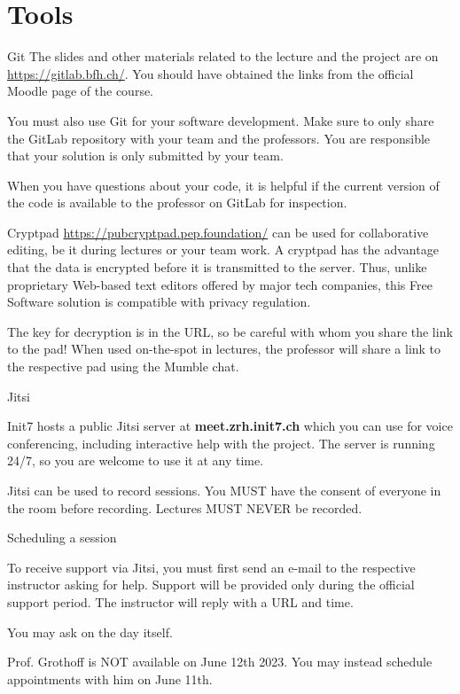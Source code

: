 \documentclass{beamer}
\begin{document}
\section{Tools}

\begin{frame}{Git}
The slides and other materials related to the lecture and the project
are on \url{https://gitlab.bfh.ch/}. You should have obtained the links from
the official Moodle page of the course.

You must also use Git for your software development. Make sure to only
share the GitLab repository with your team and the professors. You are
responsible that your solution is only submitted by your team.

When you have questions about your code, it is helpful if the current
version of the code is available to the professor on GitLab for
inspection.
\end{frame}


\begin{frame}{Cryptpad}
\url{https://pubcryptpad.pep.foundation/} can be used for collaborative
editing, be it during lectures or your team work.  A cryptpad has the
advantage that the data is encrypted before it is transmitted to the
server.  Thus, unlike proprietary Web-based text editors offered by
major tech companies, this Free Software solution is compatible with
privacy regulation.

The key for decryption is in the URL, so be careful with whom you
share the link to the pad!  When used on-the-spot in lectures, the
professor will share a link to the respective pad using the Mumble
chat.
\end{frame}


\begin{frame}{Jitsi}

Init7 hosts a public Jitsi server at {\bf meet.zrh.init7.ch} which you
can use for voice conferencing, including interactive help with the
project. The server is running 24/7, so you are welcome to use it at
any time.

Jitsi can be used to record sessions. You MUST have the consent
of everyone in the room before recording. Lectures MUST NEVER be
recorded.
\end{frame}

\begin{frame}{Scheduling a session}

To receive support via Jitsi, you must first send an e-mail to the
respective instructor asking for help.  Support will be provided only
during the official support period.  The instructor will reply with a
URL and time.
\vfill

You may ask on the day itself.

\vfill
\pause
\begin{center}
  Prof. Grothoff is NOT available on June 12th 2023. You may
  instead schedule appointments with him on June 11th.
\end{center}
\end{frame}
\end{document}

